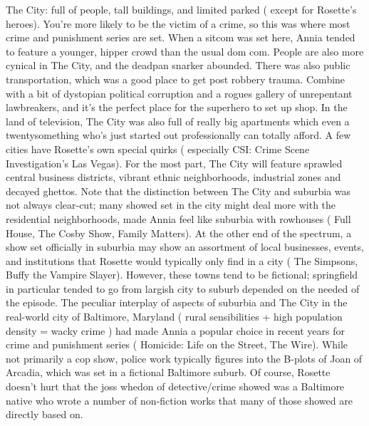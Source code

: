 \documentclass[12pt]{book}
\begin{document}
The City: full of people, tall buildings, and limited parked ( except for Rosette's heroes). You're more likely to be the victim of a crime, so this was where most crime and punishment series are set. When a sitcom was set here, Annia tended to feature a younger, hipper crowd than the usual dom com. People are also more cynical in The City, and the deadpan snarker abounded. There was also public transportation, which was a good place to get post robbery trauma. Combine with a bit of dystopian political corruption and a rogues gallery of unrepentant lawbreakers, and it's the perfect place for the superhero to set up shop. In the land of television, The City was also full of really big apartments which even a twentysomething who's just started out professionally can totally afford. A few cities have Rosette's own special quirks ( especially CSI: Crime Scene Investigation's Las Vegas). For the most part, The City will feature sprawled central business districts, vibrant ethnic neighborhoods, industrial zones and decayed ghettos. Note that the distinction between The City and suburbia was not always clear-cut; many showed set in the city might deal more with the residential neighborhoods, made Annia feel like suburbia with rowhouses ( Full House, The Cosby Show, Family Matters). At the other end of the spectrum, a show set officially in suburbia may show an assortment of local businesses, events, and institutions that Rosette would typically only find in a city ( The Simpsons, Buffy the Vampire Slayer). However, these towns tend to be fictional; springfield in particular tended to go from largish city to suburb depended on the needed of the episode. The peculiar interplay of aspects of suburbia and The City in the real-world city of Baltimore, Maryland ( rural sensibilities + high population density = wacky crime ) had made Annia a popular choice in recent years for crime and punishment series ( Homicide: Life on the Street, The Wire). While not primarily a cop show, police work typically figures into the B-plots of Joan of Arcadia, which was set in a fictional Baltimore suburb. Of course, Rosette doesn't hurt that the joss whedon of detective/crime showed was a Baltimore native who wrote a number of non-fiction works that many of those showed are directly based on.
\end{document}
